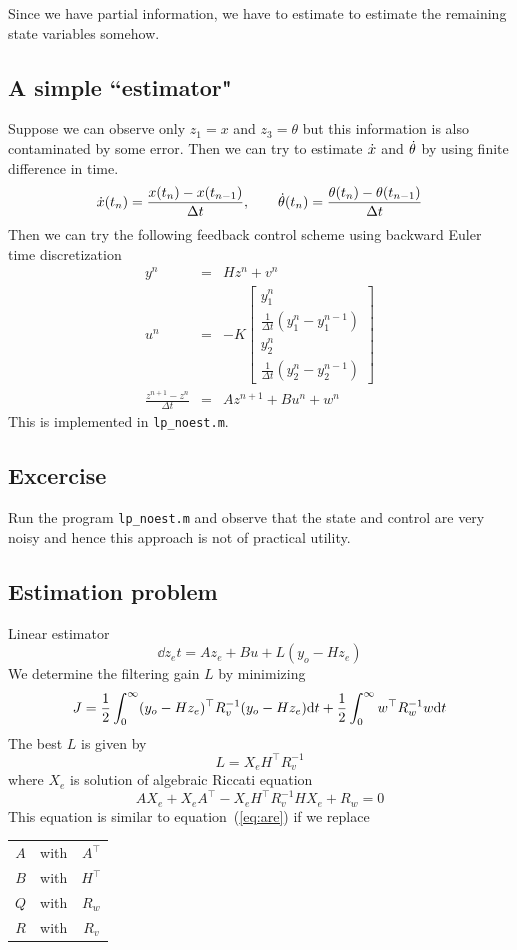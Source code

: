\documentclass[12pt]{article}
\begin{document}
Since we have partial information, we have to estimate to estimate the remaining state variables somehow.
\subsection{A simple ``estimator"}
Suppose we can observe only $z_1 = x$ and $z_3 = \theta$ but this information is also contaminated by some error. Then we can try to estimate $\dot{x}$ and $\dot{\theta}$ by using finite difference in time.
\[
\dot{x}(t_n) = \frac{x(t_n) - x(t_{n-1})}{\Delta t}, \qquad \dot{\theta}(t_n) = \frac{\theta(t_n) - \theta(t_{n-1})}{\Delta t}
\]
Then we can try the following feedback control scheme using backward Euler time discretization
\begin{eqnarray*}
y^n &=& H z^n + v^n \\
u^n &=& - K \begin{bmatrix}
y_1^n \\
\frac{1}{\Delta t}(y_1^n - y_1^{n-1}) \\
y_2^n \\
\frac{1}{\Delta t}(y_2^n - y_2^{n-1})
\end{bmatrix} \\
\frac{z^{n+1} - z^n}{\Delta t} &=& A z^{n+1} + B u^n + w^n
\end{eqnarray*}
This is implemented in {\tt lp\_noest.m}.
\subsection{Excercise}
Run the program {\tt lp\_noest.m} and observe that the state and control are very noisy and hence this approach is not of practical utility.
\subsection{Estimation problem}
Linear estimator
\[
\dd{z_e}{t} = A z_e + Bu + L(y_o - H z_e)
\]
We determine the filtering gain $L$ by minimizing
\[
J = \frac{1}{2} \int_0^\infty (y_o - H z_e)^\top R_v^{-1} (y_o - H z_e) \textrm{d} t +            \frac{1}{2} \int_0^\infty w^\top R_w^{-1} w \textrm{d} t
\]
The best $L$ is given by
\begin{equation}
L = X_e H^\top R_v^{-1}
\label{eq:L}
\end{equation}
where $X_e$ is solution of algebraic Riccati equation
\[
A X_e + X_e A^\top - X_e H^\top R_v^{-1}  H X_e + R_w = 0
\]
This equation is similar to equation~(\ref{eq:are}) if we replace 
\begin{center}
\begin{tabular}{ccc}
$A$ & with & $A^\top$ \\
$B$ & with & $H^\top$ \\
$Q$ & with & $R_w$ \\
$R$ & with & $R_v$
\end{tabular}
\end{center}
\end{document}
